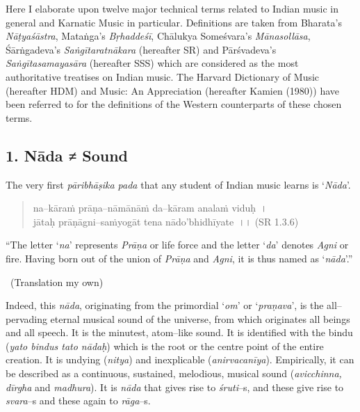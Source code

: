 Here I elaborate upon twelve major technical terms related to Indian music in general and Karnatic Music in particular. Definitions are taken from Bharata’s \textit{Nāṭyaśāstra}, Mataṅga’s \textit{Bṛhaddeśī}, Chālukya Someśvara’s \textit{Mānasollāsa}, Śārṅgadeva’s \textit{Saṅgītaratnākara} (hereafter SR) and Pārśvadeva’s \textit{Saṅgītasamayasāra} (hereafter SSS) which are considered as the most authoritative treatises on Indian music. The Harvard Dictionary of Music (hereafter HDM) and Music: An Appreciation (hereafter Kamien (1980)) have been referred to for the definitions of the Western counterparts of these chosen terms.

\subsection*{1. Nāda ≠ Sound}

The very first \textit{pāribhāṣika pada} that any student of Indian music learns is ‘\textit{Nāda}’.

\begin{verse}
na–kāraṁ prāṇa–nāmānāṁ da–kāram analaṁ viduḥ~।\\ jātaḥ prāṇāgni–saṁyogāt tena nādo’bhidhīyate~।। (SR 1.3.6)
\end{verse}

\begin{myquote}
“The letter ‘\textit{na}’ represents \textit{Prāṇa} or life force and the letter ‘\textit{da}’ denotes \textit{Agni} or fire. Having born out of the union of \textit{Prāṇa} and \textit{Agni}, it is thus named as ‘\textit{nāda}’.” 

~\hfill (Translation my own)
\end{myquote}

Indeed, this \textit{nāda}, originating from the primordial ‘\textit{om}’ or ‘\textit{praṇava}’, is the all–pervading eternal musical sound of the universe, from which originates all beings and all speech. It is the minutest, atom–like sound. It is identified with the bindu (\textit{yato bindus tato nādaḥ}) which is the root or the centre point of the entire creation. It is undying (\textit{nitya}) and inexplicable (\textit{anirvacanīya}). Empirically, it can be described as a continuous, sustained, melodious, musical sound (\textit{avicchinna, dīrgha} and \textit{madhura}). It is \textit{nāda} that gives rise to \textit{śruti}–s, and these give rise to \textit{svara}–s and these again to \textit{rāga}–s.

